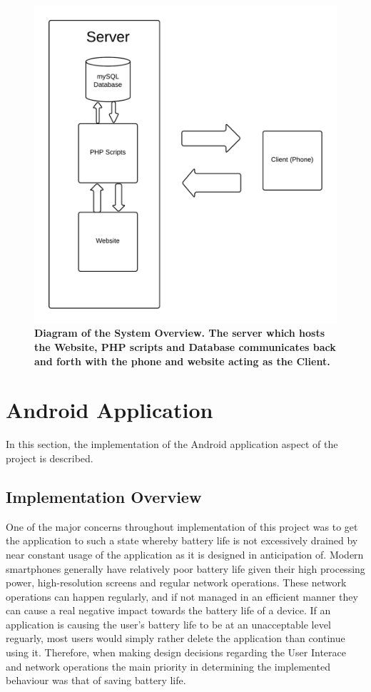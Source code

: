 \documentclass{l4proj}
\begin{document}
\begin{figure}[H]
\centering
\includegraphics[scale=0.2]{images/diagrams/systemoverview.png}
\caption{\textbf{Diagram of the System Overview. The server which hosts the Website, PHP scripts and Database communicates back and forth with the phone and website acting as the Client.}}
\label{impl:dia1}
\end{figure}

\section{Android Application}

In this section, the implementation of the Android application aspect of the project is described.

\subsection{Implementation Overview}

One of the major concerns throughout implementation of this project was to get the application to such a state whereby battery life is not excessively drained by  near constant usage of the application as it is designed in anticipation of. Modern smartphones generally have relatively poor battery life given their high processing power, high-resolution screens and regular network operations. These network operations can happen regularly, and if not managed in an efficient manner  they can cause a real negative impact towards the battery life of a device. If an application is causing the user's battery life to be at an unacceptable level reguarly, most users would simply rather delete the application than continue using it. Therefore, when making design decisions regarding the User Interace and network operations the main priority in determining the implemented behaviour was that of saving battery life.
\end{document}
